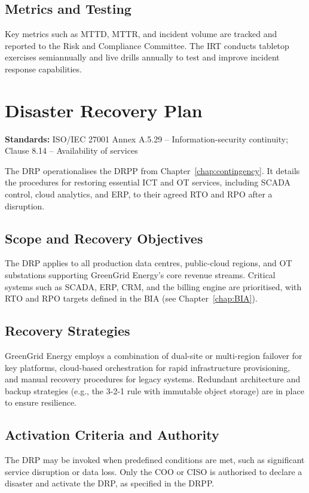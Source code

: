 \subsection{Metrics and Testing}
Key metrics such as \ac{MTTD}, \Ac{MTTR}, and incident volume are tracked and reported to the Risk and Compliance Committee. The \ac{IRT} conducts tabletop exercises semiannually and live drills annually to test and improve incident response capabilities.

\section{Disaster Recovery Plan}
\label{sec:DRP_plan}
\textbf{Standards:} ISO/IEC 27001 Annex A.5.29 – Information-security continuity; Clause 8.14 – Availability of services

The \ac{DRP} operationalises the \ac{DRPP} from Chapter~\ref{chap:contingency}. It details the procedures for restoring essential ICT and OT services, including \ac{SCADA} control, cloud analytics, and \ac{ERP}, to their agreed \ac{RTO} and \ac{RPO} after a disruption.

\subsection{Scope and Recovery Objectives}
The \ac{DRP} applies to all production data centres, public-cloud regions, and OT substations supporting GreenGrid Energy's core revenue streams. Critical systems such as \ac{SCADA}, \ac{ERP}, CRM, and the billing engine are prioritised, with \ac{RTO} and \ac{RPO} targets defined in the \ac{BIA} (see Chapter~\ref{chap:BIA}).

\subsection{Recovery Strategies}
GreenGrid Energy employs a combination of dual-site or multi-region failover for key platforms, cloud-based orchestration for rapid infrastructure provisioning, and manual recovery procedures for legacy systems. Redundant architecture and backup strategies (e.g., the 3-2-1 rule with immutable object storage) are in place to ensure resilience.

\subsection{Activation Criteria and Authority}
The \ac{DRP} may be invoked when predefined conditions are met, such as significant service disruption or data loss. Only the \ac{COO} or \ac{CISO} is authorised to declare a disaster and activate the \ac{DRP}, as specified in the \ac{DRPP}.

